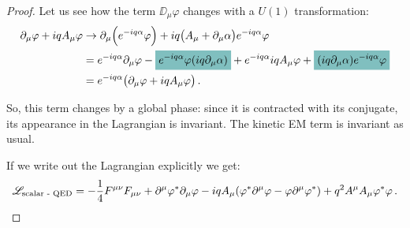 \documentclass[main.tex]{subfiles}
\begin{document}

\begin{proof}
Let us see how the term \(\DD_{\mu } \varphi \) changes with a \(U(1)\) transformation: 
%
\begin{subequations}
\begin{align}
\partial_{\mu } \varphi + i q A_{\mu } \varphi &\to 
\partial_{\mu } \qty(e^{-iq \alpha } \varphi )
+ i q \qty(A_{\mu } + \partial_{\mu }\alpha ) e^{-iq \alpha } \varphi  \\
&= e^{-iq \alpha } \partial_{\mu } \varphi 
- \hlc{teal}{e^{-iq \alpha } \varphi (iq \partial_{\mu } \alpha )} 
+e^{-iq \alpha } i q A_{\mu } \varphi 
+ \hlc{teal}{(iq \partial_{\mu }\alpha ) e^{-iq \alpha } \varphi}  \\
&= e^{-iq \alpha } \qty(\partial_{\mu } \varphi + i q A_{\mu } \varphi) 
\,.
\end{align}
\end{subequations}

So, this term changes by a global phase: since it is contracted with its conjugate, its appearance in the Lagrangian is invariant. 
The kinetic EM term is invariant as usual. 
    
If we write out the Lagrangian explicitly we get: 
%
\begin{align}
\mathscr{L}_{\text{scalar - QED}}
= - \frac{1}{4} F^{\mu \nu } F_{\mu \nu } 
+ \partial^{\mu } \varphi^{*} \partial_{\mu } \varphi 
- iq A_{\mu } \qty(\varphi^{*}\partial^{\mu } \varphi - \varphi \partial^{\mu } \varphi^{*})
+ q^2 A^{\mu }A_{\mu } \varphi^{*} \varphi 
\,.
\end{align}


\end{proof}
\end{document}
